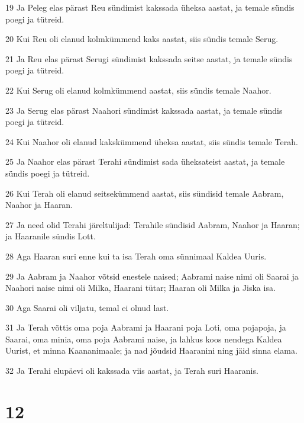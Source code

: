 \par 19 Ja Peleg elas pärast Reu sündimist kakssada üheksa aastat, ja temale sündis poegi ja tütreid.
\par 20 Kui Reu oli elanud kolmkümmend kaks aastat, siis sündis temale Serug.
\par 21 Ja Reu elas pärast Serugi sündimist kakssada seitse aastat, ja temale sündis poegi ja tütreid.
\par 22 Kui Serug oli elanud kolmkümmend aastat, siis sündis temale Naahor.
\par 23 Ja Serug elas pärast Naahori sündimist kakssada aastat, ja temale sündis poegi ja tütreid.
\par 24 Kui Naahor oli elanud kakskümmend üheksa aastat, siis sündis temale Terah.
\par 25 Ja Naahor elas pärast Terahi sündimist sada üheksateist aastat, ja temale sündis poegi ja tütreid.
\par 26 Kui Terah oli elanud seitsekümmend aastat, siis sündisid temale Aabram, Naahor ja Haaran.
\par 27 Ja need olid Terahi järeltulijad: Terahile sündisid Aabram, Naahor ja Haaran; ja Haaranile sündis Lott.
\par 28 Aga Haaran suri enne kui ta isa Terah oma sünnimaal Kaldea Uuris.
\par 29 Ja Aabram ja Naahor võtsid enestele naised; Aabrami naise nimi oli Saarai ja Naahori naise nimi oli Milka, Haarani tütar; Haaran oli Milka ja Jiska isa.
\par 30 Aga Saarai oli viljatu, temal ei olnud last.
\par 31 Ja Terah võttis oma poja Aabrami ja Haarani poja Loti, oma pojapoja, ja Saarai, oma minia, oma poja Aabrami naise, ja lahkus koos nendega Kaldea Uurist, et minna Kaananimaale; ja nad jõudsid Haaranini ning jäid sinna elama.
\par 32 Ja Terahi elupäevi oli kakssada viis aastat, ja Terah suri Haaranis.

\chapter{12}

